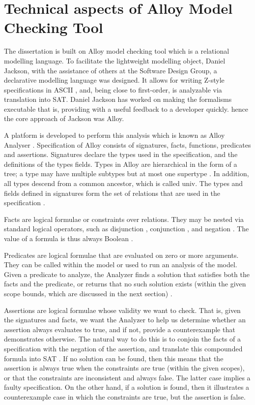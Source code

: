 \documentclass[a4paper,12pt]{report}
\begin{document}
 \chapter{Technical aspects of Alloy Model Checking Tool}
 \label{Intro to Alloy}
The dissertation is built on Alloy model checking tool which is a relational modelling language. To facilitate the lightweight modelling object, Daniel Jackson, with the assistance of others at the Software Design Group, a declarative modelling language was designed. It allows for writing Z-style specifications in ASCII \cite{J.M.Spivey1989}, and, being close to first-order, is analyzable via translation into SAT. Daniel Jackson has worked on making the formalisms executable that is, providing  with a useful feedback to a developer quickly. hence the core approach of Jackson was Alloy.

 A platform is developed to perform this analysis which is known as Alloy Analyser \cite{Yeung2005}. 
Specification of Alloy consists of signatures, facts, functions, predicates and assertions. Signatures declare the types used in the specification, and the definitions of the types fields. Types in Alloy are hierarchical in the form of a tree; a type may have multiple subtypes but at most one supertype \cite{DanielJackson2004}. In addition, all types descend from a common ancestor, which is called univ. The types and fields defined in signatures form the set of relations that are used in the specification \cite{Yeung2005}.

Facts are logical formulae or constraints over relations. They may be nested via standard logical operators, such as disjunction , conjunction , and negation . The value of a formula is thus always Boolean \cite{Yeung2005}.

Predicates are logical formulae that are evaluated on zero or more arguments. They can be called within the model or used to run an analysis of the model. Given a predicate to analyze, the Analyzer finds a solution that satisfies both the facts and the predicate, or returns that no such solution exists (within the given scope bounds, which are discussed in the next section) \cite{Yeung2005}.

Assertions are logical formulae whose validity we want to check. That is, given the signatures and facts, we want the Analyzer to help us determine whether an assertion always evaluates to true, and if not, provide a counterexample that demonstrates otherwise. The natural way to do this is to conjoin the facts of a specification with the negation of the assertion, and translate this compounded formula into SAT \cite{O.Strichman}. If no solution can be found, then this means that the assertion is always true when the constraints are true (within the given scopes), or that the constraints are inconsistent and always false. The latter case implies a faulty specification. On the other hand, if a solution is found, then it illustrates a counterexample case in which the constraints are true, but the assertion is false. 
\end{document}

